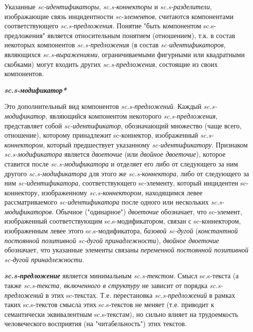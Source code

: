 Указанные \textit{sc-идентификаторы}, \textit{sc.s-коннекторы} и \textit{sc.s-разделители}, изображающие связь инцидентности \textit{sc-элементов}, считаются компонентами соответствующего \textit{sc.s-предложения}. Понятие "быть компонентом sc.s-предложения"{} является относительным понятием (отношением), т.к. в состав некоторых компонентов \textit{sc.s-предложения} (в состав \textit{sc-идентификаторов}, являющихся \textit{sc.s-выражениями}, ограничиваемыми фигурными или квадратными скобками) могут входить других \textit{sc.s-предложения}, состоящие из своих компонентов.

\bigskip
\textbf{\textit{sc.s-модификатор*}}

Это дополнительный вид компонентов \textit{sc.s-предложений}. Каждый \textit{sc.s-модификатор}, являющийся компонентом некоторого \textit{sc.s-предложения}, представляет собой \textit{sc-идентификатор}, обозначающий множество (чаще всего, отношение), которому принадлежит sc-коннектор, изображенный \textit{sc.s-коннектором}, который предшествует указанному \textit{sc-идентификатору}. Признаком \textit{sc.s-модификатора} является \textit{двоеточие} (или \textit{двойное двоеточие}), которое ставится после \textit{sc.s-модификатора} и отделяет его либо от следующего за ним другого \textit{sc.s-модификатора} для этого же \textit{sc.s-коннектора}, либо от следующего за ним \textit{sc-идентификатора}, соответствующего sc-элементу, который инцидентен sc-коннектору, изображенному \textit{sc.s-коннектором}, находящимся левее рассматриваемого \textit{sc-идентификатора} после одного или нескольких \textit{sc.s-модификаторов}. Обычное ("одинарное"{}) \textit{двоеточие} обозначает, что sc-элемент, изображенный соответствующим \mbox{sc.s-модификатором}, связан с sc-коннектором, изображенным левее этого \mbox{sc.s-модификатора}, \textit{базовой \mbox{sc-дугой}} (\textit{константной постоянной позитивной \mbox{sc-дугой} принадлежности}), \textit{двойное двоеточие} обозначает, что указанные элементы связаны \textit{переменной постоянной позитивной \mbox{sc-дугой} принадлежности}.

\begin{SCn}
\end{SCn}

\textbf{\textit{sc.s-предложение}} является минимальным \textit{sc.s-текстом}. Смысл sc.s-текста (а также \textit{sc.s-текста, включенного в структуру} не зависит от порядка \textit{\mbox{sc.s-предложений}} в этих sc-текстах. Т.е. перестановка \textit{\mbox{sc.s-предложений}} в рамках таких \mbox{sc.s-текстов} смысла этих \mbox{sc.s-текстов} не меняет (т.е. приводит к семантически эквивалентным \mbox{sc.s-текстам}), но сильно влияет на трудоемкость человеческого восприятия (на "читабельность"{}) этих текстов.

